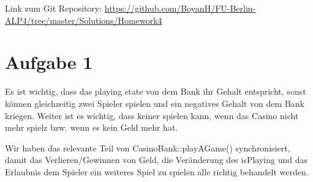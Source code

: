 \usepackage{graphicx}
\usepackage{amsmath}
\usepackage{amssymb}

\newcommand{\dozent}{Prof. Dr. Margarita Esponda}					%
\newcommand{\tutor}{Lilli Walter}						%
\newcommand{\tutoriumNo}{6}				%
\newcommand{\projectNo}{4}									%
\newcommand{\veranstaltung}{Nichtsequentielle Programmierung}	%
\newcommand{\semester}{SoeSe 2017}						%
\newcommand{\studenten}{Boyan Hristov, Sergelen Gongor}			%





Link zum Git Repository: \url{https://github.com/BoyanH/FU-Berlin-ALP4/tree/master/Solutions/Homework4}


\section*{Aufgabe 1}

Es ist wichtig, dass das playing state von dem Bank ihr Gehalt entspricht, sonst können gleichzeitig zwei Spieler spielen und ein negatives Gehalt von dem Bank kriegen. Weiter ist es wichtig, dass keiner spielen kann, wenn das Casino nicht mehr spielz bzw. wenn es kein Geld mehr hat. 

Wir haben das relevante Teil von CasinoBank::playAGame() synchronisiert, damit das Verlieren/Gewinnen von Geld, die Veränderung des isPlaying und das Erlaubnis dem Spieler ein weiteres Spiel zu spielen alle richtig behandelt werden.

